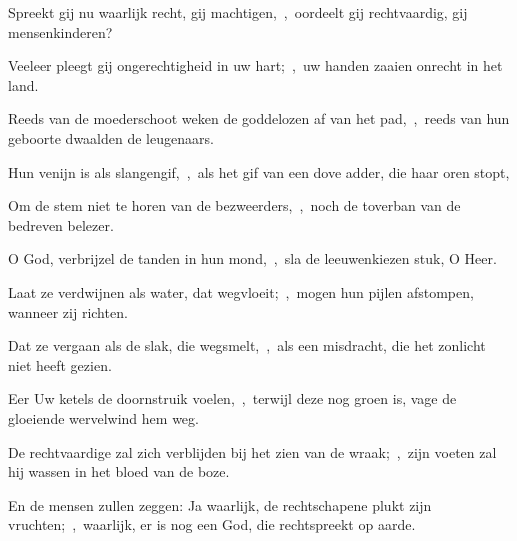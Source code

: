 \documentclass[12pt,twoside,a5paper]{article}
\begin{document}
\begin{halfparskip}
  Spreekt gij nu waarlijk recht, gij machtigen,~\sep\ oordeelt gij rechtvaardig, gij mensenkinderen?


  Veeleer pleegt gij ongerechtigheid in uw hart;~\sep\ uw handen zaaien onrecht in het land.

  Reeds van de moederschoot weken de goddelozen af van het pad,~\sep\ reeds van hun geboorte dwaalden de leugenaars.

  Hun venijn is als slangengif,~\sep\ als het gif van een dove adder, die haar oren stopt,

  Om de stem niet te horen van de bezweerders,~\sep\ noch de toverban van de bedreven belezer.
\end{halfparskip}


\begin{halfparskip}
  O God, verbrijzel de tanden in hun mond,~\sep\ sla de leeuwenkiezen stuk, O Heer.

  Laat ze verdwijnen als water, dat wegvloeit;~\sep\ mogen hun pijlen afstompen, wanneer zij richten.

  Dat ze vergaan als de slak, die wegsmelt,~\sep\ als een misdracht, die het zonlicht niet heeft gezien.

  Eer Uw ketels de doornstruik voelen,~\sep\ terwijl deze nog groen is, vage de gloeiende wervelwind hem weg.

  De rechtvaardige zal zich verblijden bij het zien van de wraak;~\sep\ zijn voeten zal hij wassen in het bloed van de boze.

  En de mensen zullen zeggen: Ja waarlijk, de rechtschapene plukt zijn vruchten;~\sep\ waarlijk, er is nog een God, die rechtspreekt op aarde.
\end{halfparskip}





\end{document}
